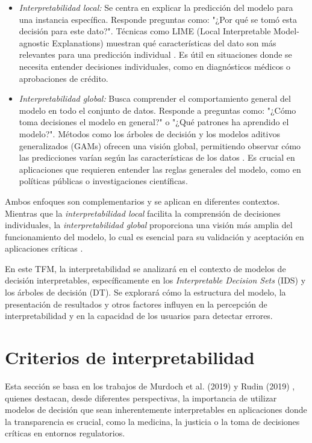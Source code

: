 \begin{itemize}
    \item \textit{Interpretabilidad local:} Se centra en explicar la predicción del modelo para una instancia específica. Responde preguntas como: "¿Por qué se tomó esta decisión para este dato?". Técnicas como LIME (Local Interpretable Model-agnostic Explanations) muestran qué características del dato son más relevantes para una predicción individual \cite{doshi2017towards, gilpin2018explaining}. Es útil en situaciones donde se necesita entender decisiones individuales, como en diagnósticos médicos o aprobaciones de crédito.

    \item \textit{Interpretabilidad global:} Busca comprender el comportamiento general del modelo en todo el conjunto de datos. Responde a preguntas como: "¿Cómo toma decisiones el modelo en general?" o "¿Qué patrones ha aprendido el modelo?". Métodos como los árboles de decisión y los modelos aditivos generalizados (GAMs) ofrecen una visión global, permitiendo observar cómo las predicciones varían según las características de los datos \cite{doshi2017towards, Kaur-2020}. Es crucial en aplicaciones que requieren entender las reglas generales del modelo, como en políticas públicas o investigaciones científicas.
\end{itemize}

Ambos enfoques son complementarios y se aplican en diferentes contextos. Mientras que la \textit{interpretabilidad local} facilita la comprensión de decisiones individuales, la \textit{interpretabilidad global} proporciona una visión más amplia del funcionamiento del modelo, lo cual es esencial para su validación y aceptación en aplicaciones críticas \cite{gilpin2018explaining, doshi2017towards, Kaur-2020}.

En este TFM, la interpretabilidad se analizará en el contexto de modelos de decisión interpretables, específicamente en los \textit{Interpretable Decision Sets} (IDS) y los árboles de decisión (DT). Se explorará cómo la estructura del modelo, la presentación de resultados y otros factores influyen en la percepción de interpretabilidad y en la capacidad de los usuarios para detectar errores.

\section{Criterios de interpretabilidad}

Esta sección se basa en los trabajos de Murdoch et al. (2019) \cite{murdoch2019interpretable} y Rudin (2019) \cite{Rudin-2019}, quienes destacan, desde diferentes perspectivas, la importancia de utilizar modelos de decisión que sean inherentemente interpretables en aplicaciones donde la transparencia es crucial, como la medicina, la justicia o la toma de decisiones críticas en entornos regulatorios. 

